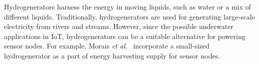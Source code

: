 Hydrogenerators harness the energy in moving liquids, such as water or a mix of different liquids. Traditionally, hydrogenerators are used for generating large-scale electricity from rivers and streams. However, since the possible underwater applications in IoT, hydrogenerators can be a suitable alternative for powering sensor nodes. For example, Morais \textit{et al.}~\cite{morais2008sun} incorporate a small-sized hydrogenerator as a part of energy harvesting supply for sensor nodes. 







